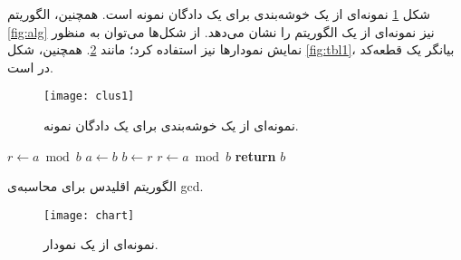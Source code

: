 			شکل \ref{fig:clus1} نمونه‌ای از یک خوشه‌بندی برای یک دادگان نمونه است. همچنین، الگوریتم \ref{fig:alg} نیز نمونه‌ای از یک الگوریتم را نشان می‌دهد. از شکل‌ها می‌توان به منظور نمایش نمودارها نیز استفاده کرد؛ مانند \ref{fig:chart}. همچنین، شکل \ref{fig:tbl1}، بیانگر یک قطعه‌کد در \lr{\LaTeX} است. 
			
			\begin{figure}
				\centering
				\texttt{[image: clus1]}
				\caption{نمونه‌ای از یک خوشه‌بندی برای یک دادگان نمونه.}
				\label{fig:clus1}
			\end{figure}
		
		\begin{algorithm}
				\begin{latin}
		\begin{algorithmic}[1] %
         
            \State $r\gets a \bmod b$
             
                \State $a \gets b$
                \State $b \gets r$
                \State $r \gets a \bmod b$
            \EndWhile\label{euclidendwhile}
            \State \textbf{return} $b$
        \EndProcedure
    \end{algorithmic}
    \end{latin}
    		\caption{الگوریتم اقلیدس برای محاسبه‌ی \gls*{gcd}.}
				\label{fig:alg}		
		\end{algorithm}	
			
			\begin{figure}
				\centering
				\texttt{[image: chart]}
				\caption{نمونه‌ای از یک نمودار.}
				\label{fig:chart}
			\end{figure}
		
